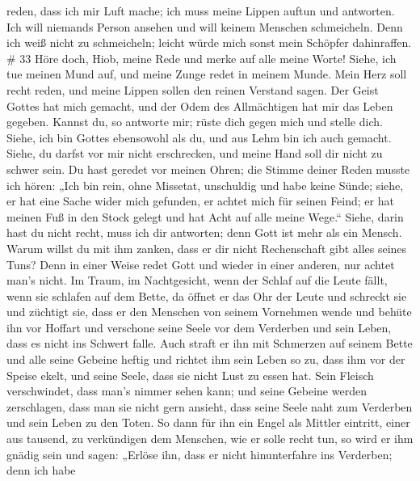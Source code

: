 reden, dass ich mir Luft mache; ich muss meine Lippen auftun und
antworten.  Ich will niemands Person ansehen und will
keinem Menschen schmeicheln.  Denn ich weiß nicht zu
schmeicheln; leicht würde mich sonst mein Schöpfer dahinraffen. \# 33
 Höre doch, Hiob, meine Rede und merke auf alle meine Worte!
 Siehe, ich tue meinen Mund auf, und meine Zunge redet in
meinem Munde.  Mein Herz soll recht reden, und meine Lippen
sollen den reinen Verstand sagen.  Der Geist Gottes hat mich
gemacht, und der Odem des Allmächtigen hat mir das Leben gegeben.
 Kannst du, so antworte mir; rüste dich gegen mich und
stelle dich.  Siehe, ich bin Gottes ebensowohl als du, und
aus Lehm bin ich auch gemacht.  Siehe, du darfst vor mir
nicht erschrecken, und meine Hand soll dir nicht zu schwer sein.
 Du hast geredet vor meinen Ohren; die Stimme deiner Reden
musste ich hören:  „Ich bin rein, ohne Missetat, unschuldig
und habe keine Sünde;  siehe, er hat eine Sache wider mich
gefunden, er achtet mich für seinen Feind;  er hat meinen
Fuß in den Stock gelegt und hat Acht auf alle meine Wege.``
 Siehe, darin hast du nicht recht, muss ich dir antworten;
denn Gott ist mehr als ein Mensch.  Warum willst du mit ihm
zanken, dass er dir nicht Rechenschaft gibt alles seines Tuns?
 Denn in einer Weise redet Gott und wieder in einer
anderen, nur achtet man's nicht.  Im Traum, im
Nachtgesicht, wenn der Schlaf auf die Leute fällt, wenn sie schlafen auf
dem Bette,  da öffnet er das Ohr der Leute und schreckt sie
und züchtigt sie,  dass er den Menschen von seinem
Vornehmen wende und behüte ihn vor Hoffart  und verschone
seine Seele vor dem Verderben und sein Leben, dass es nicht ins Schwert
falle.  Auch straft er ihn mit Schmerzen auf seinem Bette
und alle seine Gebeine heftig  und richtet ihm sein Leben
so zu, dass ihm vor der Speise ekelt, und seine Seele, dass sie nicht
Lust zu essen hat.  Sein Fleisch verschwindet, dass man's
nimmer sehen kann; und seine Gebeine werden zerschlagen, dass man sie
nicht gern ansieht,  dass seine Seele naht zum Verderben
und sein Leben zu den Toten.  So dann für ihn ein Engel als
Mittler eintritt, einer aus tausend, zu verkündigen dem Menschen, wie er
solle recht tun,  so wird er ihm gnädig sein und sagen:
„Erlöse ihn, dass er nicht hinunterfahre ins Verderben; denn ich habe
